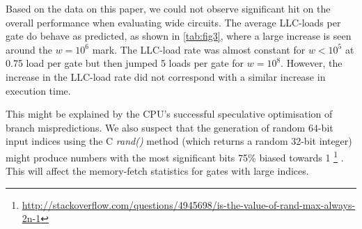 Based on the data on this paper, we could not observe significant hit on the
overall performance when evaluating wide circuits. The average LLC-loads per
gate do behave as predicted, as shown in \ref{tab:fig3}, where a large increase
is seen around the $w = 10^6$ mark. The LLC-load rate was almost constant for
$w < 10^5 $ at 0.75 load per gate but then jumped 5 loads per gate for $w = 10^8$.
However, the increase in the LLC-load rate did not correspond with a similar
increase in execution time.
\par
This might be explained by the CPU's successful speculative optimisation of branch
mispredictions. We also suspect that the generation of random 64-bit input indices
using the C \textit{rand()} method (which returns a random 32-bit integer) might
produce numbers with the most significant bits 75\% biased towards 1
\footnote{\url{http://stackoverflow.com/questions/4945698/is-the-value-of-rand-max-always-2n-1}}
. This will affect the memory-fetch statistics for gates with large indices.
